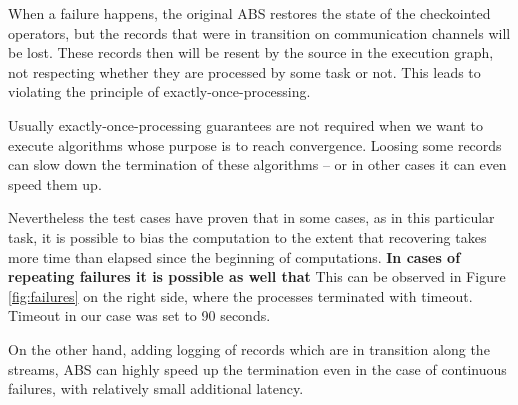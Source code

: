 When a failure happens, the original ABS restores the state of the checkointed operators, but the records that were in transition on communication channels will be lost. These records then will be resent by the source in the execution graph, not respecting whether they are processed by some task or not. This leads to violating the principle of exactly-once-processing.

Usually exactly-once-processing guarantees are not required when we want to execute algorithms whose purpose is to reach convergence. Loosing some records can slow down the termination of these algorithms -- or in other cases it can even speed them up. 

Nevertheless the test cases have proven that in some cases, as in this particular task, it is possible  to bias the computation to the extent that recovering takes more time than elapsed since the beginning of computations. {\bf In cases of repeating failures it is possible as well that}  This can be observed in Figure \ref{fig:failures} on the right side, where the processes terminated with timeout. Timeout in our case was set to 90 seconds.  

On the other hand, adding logging of records which are in transition along the streams, ABS can highly speed up the termination even in the case of continuous failures, with relatively small additional latency. 



